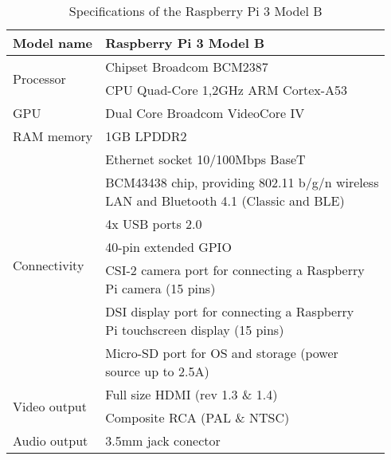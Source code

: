 	\begin{table}[h!b]
		\centering
	    \begin{tabular}{| l | l |}
	    \hline
	    Model name & Raspberry Pi 3 Model B \\\hline
	    \multirow{2}{*}{Processor} & Chipset Broadcom BCM2387 \\ \cline{2-2}
                             	   & CPU Quad-Core 1,2GHz ARM Cortex-A53 \\\hline
		GPU & Dual Core Broadcom VideoCore IV \\\hline
		RAM memory & 1GB LPDDR2 \\\hline	    	    			
		\multirow{7}{*}{Connectivity} & Ethernet socket 10/100Mbps BaseT \\ \cline{2-2}
                             	   & \makecell[tl]{BCM43438 chip, providing 802.11 b/g/n wireless \\ LAN and Bluetooth 4.1 (Classic and BLE)} \\ \cline{2-2}
                             	   & 4x USB ports 2.0 \\ \cline{2-2}
                             	   & 40-pin extended GPIO \\ \cline{2-2}
                             	   & \makecell[tl]{CSI-2 camera port for connecting a Raspberry \\ Pi camera (15 pins)} \\ \cline{2-2}
                             	   & \makecell[tl]{DSI display port for connecting a Raspberry \\ Pi touchscreen display (15 pins)} \\ \cline{2-2}
                             	   & \makecell[tl]{Micro-SD port for OS and storage (power \\ source up to 2.5A)} \\\hline
        \multirow{2}{*}{Video output} & Full size HDMI (rev 1.3 \& 1.4) \\ \cline{2-2}
                             	   & Composite RCA (PAL \& NTSC) \\\hline
        Audio output & 3.5mm jack conector \\\hline
	    \end{tabular}
	    \caption{Specifications of the Raspberry Pi 3 Model B}
	    \label{table:rasp_pi_specs}
	\end{table}

